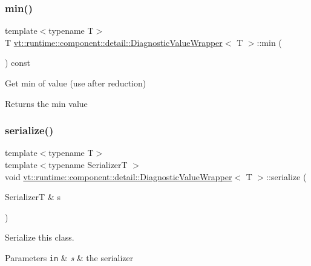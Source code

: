 \subsubsection{\texorpdfstring{min()}{min()}}
{\footnotesize\ttfamily template$<$typename T$>$ \\
T \hyperlink{structvt_1_1runtime_1_1component_1_1detail_1_1_diagnostic_value_wrapper}{vt\+::runtime\+::component\+::detail\+::\+Diagnostic\+Value\+Wrapper}$<$ T $>$\+::min (\begin{DoxyParamCaption}{ }\end{DoxyParamCaption}) const\hspace{0.3cm}{\ttfamily [inline]}}



Get min of value (use after reduction) 

\begin{DoxyReturn}{Returns}
the min value 
\end{DoxyReturn}
\mbox{\label{structvt_1_1runtime_1_1component_1_1detail_1_1_diagnostic_value_wrapper_a42da2afbb1bc830b6fed0a16fd355b67}} 
\subsubsection{\texorpdfstring{serialize()}{serialize()}}
{\footnotesize\ttfamily template$<$typename T$>$ \\
template$<$typename SerializerT $>$ \\
void \hyperlink{structvt_1_1runtime_1_1component_1_1detail_1_1_diagnostic_value_wrapper}{vt\+::runtime\+::component\+::detail\+::\+Diagnostic\+Value\+Wrapper}$<$ T $>$\+::serialize (\begin{DoxyParamCaption}\item[{SerializerT \&}]{s }\end{DoxyParamCaption})\hspace{0.3cm}{\ttfamily [inline]}}



Serialize this class. 


\begin{DoxyParams}[1]{Parameters}
\mbox{\tt in}  & {\em s} & the serializer \\
\hline
\end{DoxyParams}
\mbox{\label{structvt_1_1runtime_1_1component_1_1detail_1_1_diagnostic_value_wrapper_a543d6dc86703f061dce2b45a24a8dc9b}} 
